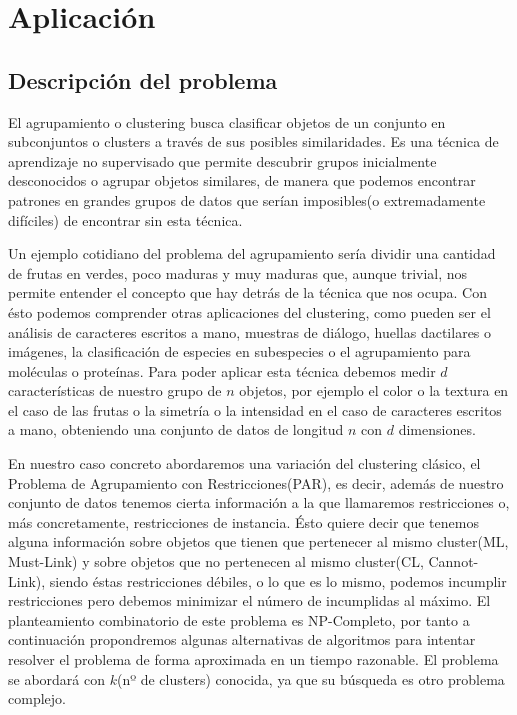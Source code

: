 \documentclass{article}
\begin{document}
	\section{Aplicación}
	\subsection{Descripción del problema}
	\indent El agrupamiento o clustering busca clasificar objetos de un conjunto en subconjuntos o clusters a
	través de sus posibles similaridades. Es una técnica de aprendizaje no supervisado que permite
	descubrir grupos inicialmente desconocidos o agrupar objetos similares, de manera que podemos
	encontrar patrones en grandes grupos de datos que serían imposibles(o extremadamente difíciles) de
	encontrar sin esta técnica.
	\par
	Un ejemplo cotidiano del problema del agrupamiento sería dividir una cantidad de frutas en verdes,
	poco maduras y muy maduras que, aunque trivial, nos permite entender el concepto que hay detrás
	de la técnica que nos ocupa. Con ésto podemos comprender otras aplicaciones del clustering, como
	pueden ser el análisis de caracteres escritos a mano, muestras de diálogo, huellas dactilares o
	imágenes, la clasificación de especies en subespecies o el agrupamiento para moléculas o proteínas.
	Para poder aplicar esta técnica debemos medir $d$ características de nuestro grupo de $n$ objetos, por
	ejemplo el color o la textura en el caso de las frutas o la simetría o la intensidad en el caso de
	caracteres escritos a mano, obteniendo una conjunto de datos de longitud $n$ con $d$ dimensiones.
	\par
	En nuestro caso concreto abordaremos una variación del clustering clásico, el Problema de
	Agrupamiento con Restricciones(PAR), es decir, además de nuestro conjunto de datos tenemos
	cierta información a la que llamaremos restricciones o, más concretamente, restricciones de
	instancia. Ésto quiere decir que tenemos alguna información sobre objetos que tienen que
	pertenecer al mismo cluster(ML, Must-Link) y sobre objetos que no pertenecen al mismo
	cluster(CL, Cannot-Link), siendo éstas restricciones débiles, o lo que es lo mismo, podemos
	incumplir restricciones pero debemos minimizar el número de incumplidas al máximo.
	El planteamiento combinatorio de este problema es NP-Completo, por tanto a continuación
	propondremos algunas alternativas de algoritmos para intentar resolver el problema de forma
	aproximada en un tiempo razonable. El problema se abordará con $k$(nº de clusters) conocida, ya que
	su búsqueda es otro problema complejo.
	
\end{document}
